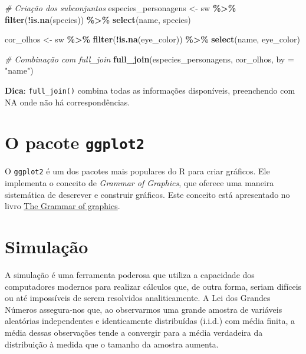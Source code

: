 \documentclass[
]{book}
\newenvironment{Shaded}{\begin{snugshade}}{\end{snugshade}}
\newcommand{\AttributeTok}[1]{\textcolor[rgb]{0.13,0.29,0.53}{#1}}
\newcommand{\CommentTok}[1]{\textcolor[rgb]{0.56,0.35,0.01}{\textit{#1}}}
\newcommand{\FunctionTok}[1]{\textcolor[rgb]{0.13,0.29,0.53}{\textbf{#1}}}
\newcommand{\NormalTok}[1]{#1}
\newcommand{\OtherTok}[1]{\textcolor[rgb]{0.56,0.35,0.01}{#1}}
\newcommand{\SpecialCharTok}[1]{\textcolor[rgb]{0.81,0.36,0.00}{\textbf{#1}}}
\newcommand{\StringTok}[1]{\textcolor[rgb]{0.31,0.60,0.02}{#1}}
\begin{document}
\begin{Shaded}
\begin{Highlighting}[]
\CommentTok{\# Criação dos subconjuntos}
\NormalTok{especies\_personagens }\OtherTok{\textless{}{-}}\NormalTok{ sw }\SpecialCharTok{\%\textgreater{}\%} 
  \FunctionTok{filter}\NormalTok{(}\SpecialCharTok{!}\FunctionTok{is.na}\NormalTok{(species)) }\SpecialCharTok{\%\textgreater{}\%} 
  \FunctionTok{select}\NormalTok{(name, species)}

\NormalTok{cor\_olhos }\OtherTok{\textless{}{-}}\NormalTok{ sw }\SpecialCharTok{\%\textgreater{}\%} 
  \FunctionTok{filter}\NormalTok{(}\SpecialCharTok{!}\FunctionTok{is.na}\NormalTok{(eye\_color)) }\SpecialCharTok{\%\textgreater{}\%} 
  \FunctionTok{select}\NormalTok{(name, eye\_color)}

\CommentTok{\# Combinação com full\_join}
\FunctionTok{full\_join}\NormalTok{(especies\_personagens, cor\_olhos, }\AttributeTok{by =} \StringTok{"name"}\NormalTok{)}
\end{Highlighting}
\end{Shaded}

\textbf{Dica}: \texttt{full\_join()} combina todas as informações disponíveis,
preenchendo com NA onde não há correspondências.

\chapter{\texorpdfstring{O pacote \texttt{ggplot2}}{O pacote ggplot2}}\label{o-pacote-ggplot2}

O \texttt{ggplot2} é um dos pacotes mais populares do R para criar gráficos.
Ele implementa o conceito de \emph{Grammar of Graphics}, que oferece uma
maneira sistemática de descrever e construir gráficos. Este conceito
está apresentado no livro \href{https://link.springer.com/book/10.1007/0-387-28695-0}{The Grammar of
graphics}.

\chapter{Simulação}\label{simulauxe7uxe3o}

A simulação é uma ferramenta poderosa que utiliza a capacidade dos
computadores modernos para realizar cálculos que, de outra forma, seriam
difíceis ou até impossíveis de serem resolvidos analiticamente. A Lei
dos Grandes Números assegura-nos que, ao observarmos uma grande amostra
de variáveis aleatórias independentes e identicamente distribuídas
(i.i.d.) com média finita, a média dessas observações tende a convergir
para a média verdadeira da distribuição à medida que o tamanho da
amostra aumenta.
\end{document}

